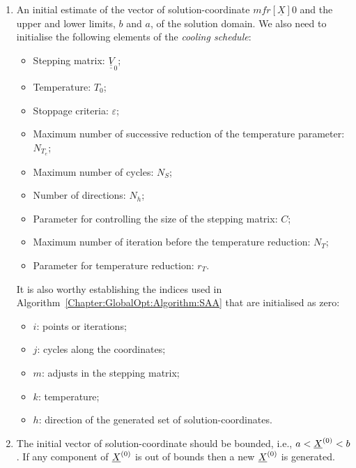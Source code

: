 \begin{enumerate}[{\bf Step 1: }]
   \item\label{Step1} An initial estimate of the vector of solution-coordinate $mfr[\underline{X}]{}{0}$ and the upper and lower limits, $b$ and $a$, of the solution domain.  We also need to initialise the following elements of the {\it cooling schedule}:
   \begin{itemize}
      \item Stepping matrix: $\underline{\underline{V}}_{0}$;
      \item Temperature: $T_{0}$;
      \item Stoppage criteria: $\varepsilon$;
      \item Maximum number of successive reduction of the temperature parameter: $N_{T_{e}}$;
      \item Maximum number of cycles: $N_{S}$;
      \item Number of directions: $N_{h}$;
      \item Parameter for controlling the size of the stepping matrix: $C$;
      \item Maximum number of iteration before the temperature reduction: $N_{T}$;
      \item Parameter for temperature reduction: $r_{T}$.
   \end{itemize}
   It is also worthy establishing the indices used in Algorithm~\ref{Chapter:GlobalOpt:Algorithm:SAA} that are initialised as zero:
   \begin{itemize}
      \item $i$: points or iterations;
      \item $j$: cycles along the coordinates;
      \item $m$: adjusts in the stepping matrix;
      \item $k$: temperature;
      \item $h$: direction of the generated set of solution-coordinates.
   \end{itemize}

   \item\label{Step2} The initial vector of solution-coordinate should be bounded, i.e., $a <\mfr[\underline{X}]{}{0}< b$. If any component of $\mfr[\underline{X}]{}{0}$ is out of bounds then a new $\mfr[\underline{X}]{}{0}$ is generated.


\end{enumerate}
